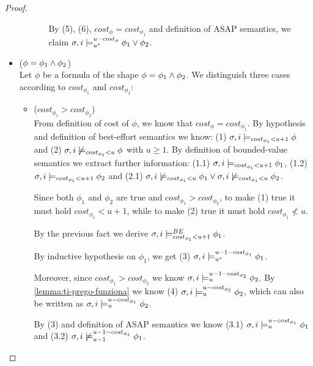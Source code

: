 \begin{theorem}
\begin{proof}
\begin{itemize}
\begin{itemize}
\begin{itemize}
            By (5), (6), $cost_\phi = cost_{\phi_1}$ and definition of ASAP semantics, we claim $\sigma, i \models_{{u}^*}^{u-cost_\phi} \phi_1 \lor \phi_2$.
        \end{itemize}
    \end{itemize}

    \item ($\phi = \phi_1 \land \phi_2$) \\
    Let $\phi$ be a formula of the shape $\phi = \phi_1 \land \phi_2$.
    We distinguish three cases according to $cost_{\phi_1}$ and $cost_{\phi_2}$:
    \begin{itemize}
        \item ($cost_{\phi_1} > cost_{\phi_2}$) \\
        From definition of cost of $\phi$, we know that $cost_\phi = cost_{\phi_1}$.
        By hypothesis and definition of best-effort semantics we know: 
        (1) $\sigma,i \models_{cost_{\phi_1} < u + 1} \phi$ and 
        (2) $\sigma,i \not\models_{cost_{\phi_1} < u} \phi$ with $u \geq 1$.
        By definition of bounded-value semantics we extract further information: 
        (1.1) $\sigma,i \models_{cost_{\phi_1} < u + 1} \phi_1$, 
        (1.2) $\sigma,i \models_{cost_{\phi_1} < u + 1} \phi_2$ and 
        (2.1) $\sigma,i \not\models_{cost_{\phi_1} < u} \phi_1 \lor \sigma,i \not\models_{cost_{\phi_1} < u} \phi_2$.
        
        Since both $\phi_1$ and $\phi_2$ are true and $cost_{\phi_1} > cost_{\phi_2}$, to make (1) true it must hold $cost_{\phi_1} < u + 1$, while to make (2) true it must hold $cost_{\phi_1} \not< u$.
        
        By the previous fact we derive $\sigma,i \models_{cost_{\phi_1} < u + 1}^{BE} \phi_1$.
        
        By inductive hypothesis on $\phi_1$, we get (3) $\sigma, i \models_{{u}^*}^{u-1-cost_{\phi_1}} \phi_1$.
        
        Moreover, since $cost_{\phi_1} > cost_{\phi_2}$ we know $\sigma, i \models_{u}^{u-1-cost_{\phi_2}} \phi_2$. 
        By \autoref{lemma:ti-prego-funziona} we know (4) $\sigma, i \models_{u}^{u-cost_{\phi_2}} \phi_2$, which can also be written as $\sigma, i \models_{u}^{u-cost_{\phi_1}} \phi_2$.
        
        By (3) and definition of ASAP semantics we know (3.1) $\sigma, i \models_{u}^{u-cost_{\phi_1}} \phi_1$ and (3.2) $\sigma, i \not\models_{u-1}^{u-1-cost_{\phi_1}} \phi_1$.


\end{itemize}
\end{itemize}
\end{proof}
\end{theorem}
